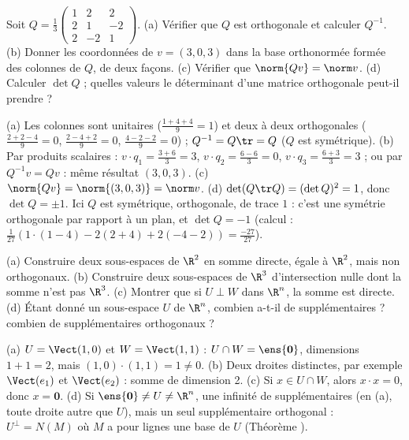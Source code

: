 \begin{exo}
Soit $Q=\frac13\begin{pmatrix}1&2&2\\2&1&-2\\2&-2&1\end{pmatrix}$. (a) Vérifier que $Q$ est orthogonale et calculer $Q^{-1}$. (b) Donner les coordonnées de $v=(3,0,3)$ dans la base orthonormée formée des colonnes de $Q$, de deux façons. (c) Vérifier que $\norm{Qv}=\norm v$. (d) Calculer $\det Q$ ; quelles valeurs le déterminant d'une matrice orthogonale peut-il prendre ?
\begin{corrige}
(a) Les colonnes sont unitaires ($\frac{1+4+4}9=1$) et deux à deux orthogonales ($\frac{2+2-4}9=0$, $\frac{2-4+2}9=0$, $\frac{4-2-2}9=0$) ; $Q^{-1}=Q\tr=Q$ ($Q$ est symétrique). (b) Par produits scalaires : $v\cdot q_1=\frac{3+6}3=3$, $v\cdot q_2=\frac{6-6}3=0$, $v\cdot q_3=\frac{6+3}3=3$ ; ou par $Q^{-1}v=Qv$ : même résultat $(3,0,3)$. (c) $\norm{Qv}=\norm{(3,0,3)}=\norm v$. (d) $\det(Q\tr Q)=(\det Q)^2=1$, donc $\det Q=\pm1$. Ici $Q$ est symétrique, orthogonale, de trace $1$ : c'est une symétrie orthogonale par rapport à un plan, et $\det Q=-1$ (calcul : $\frac1{27}(1\cdot(1-4)-2(2+4)+2(-4-2))=\frac{-27}{27}$).
\end{corrige}
\end{exo}
\begin{exo}
(a) Construire deux sous-espaces de $\R^2$ en somme directe, égale à $\R^2$, mais non orthogonaux. (b) Construire deux sous-espaces de $\R^3$ d'intersection nulle dont la somme n'est pas $\R^3$. (c) Montrer que si $U\perp W$ dans $\R^n$, la somme est directe. (d) Étant donné un sous-espace $U$ de $\R^n$, combien a-t-il de supplémentaires ? combien de supplémentaires orthogonaux ?
\begin{corrige}
(a) $U=\Vect(1,0)$ et $W=\Vect(1,1)$ : $U\cap W=\ens{\mathbf 0}$, dimensions $1+1=2$, mais $(1,0)\cdot(1,1)=1\neq0$. (b) Deux droites distinctes, par exemple $\Vect(e_1)$ et $\Vect(e_2)$ : somme de dimension 2. (c) Si $x\in U\cap W$, alors $x\cdot x=0$, donc $x=\mathbf 0$. (d) Si $\ens{\mathbf 0}\neq U\neq\R^n$, une infinité de supplémentaires (en (a), toute droite autre que $U$), mais un seul supplémentaire orthogonal : $U^\perp=N(M)$ où $M$ a pour lignes une base de $U$ (Théorème ).
\end{corrige}
\end{exo}

